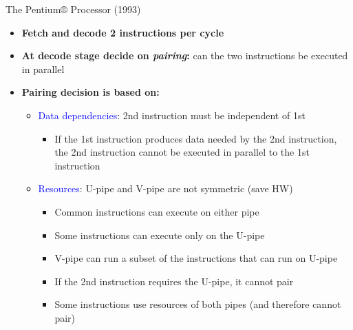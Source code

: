 \documentclass[aspectratio=169,12pt]{beamer}
\begin{document}
\begin{frame}{The Pentium® Processor (1993)}
  \begin{itemize}
    \item \textbf{Fetch and decode 2 instructions per cycle}
    
    \item \textbf{At decode stage decide on \emph{pairing}:} can the two instructions be executed in parallel
    
    \item \textbf{Pairing decision is based on:}
    \begin{itemize}
      \item \textcolor{blue}{Data dependencies}: 2nd instruction must be independent of 1st
      \begin{itemize}
        \item If the 1st instruction produces data needed by the 2nd instruction, the 2nd instruction cannot be executed in parallel to the 1st instruction
      \end{itemize}
      
      \item \textcolor{blue}{Resources}: U-pipe and V-pipe are not symmetric (save HW)
      \begin{itemize}
        \item Common instructions can execute on either pipe
        \item Some instructions can execute only on the U-pipe
        \item V-pipe can run a subset of the instructions that can run on U-pipe
        \item If the 2nd instruction requires the U-pipe, it cannot pair
        \item Some instructions use resources of both pipes (and therefore cannot pair)
      \end{itemize}
    \end{itemize}
  \end{itemize}
  
  \begin{center}
  \end{center}
\end{frame}
\end{document}
